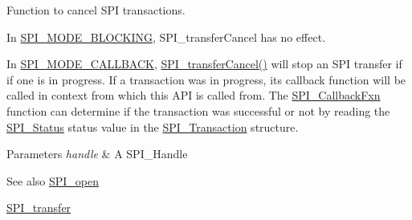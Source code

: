 Function to cancel S\+P\+I transactions. 

In \hyperlink{_s_p_i_8h_ab9ea76c6529d6076eee5e1c4a5a92c6fa0dfb2358e008316426895e7237c398e8}{S\+P\+I\+\_\+\+M\+O\+D\+E\+\_\+\+B\+L\+O\+C\+K\+I\+N\+G}, S\+P\+I\+\_\+transfer\+Cancel has no effect.

In \hyperlink{_s_p_i_8h_ab9ea76c6529d6076eee5e1c4a5a92c6fa5631e69925c47a62a261c78ebbda39fb}{S\+P\+I\+\_\+\+M\+O\+D\+E\+\_\+\+C\+A\+L\+L\+B\+A\+C\+K}, \hyperlink{_s_p_i_8h_a6819f7761fc3505c4f885653ff8121f0}{S\+P\+I\+\_\+transfer\+Cancel()} will stop an S\+P\+I transfer if if one is in progress. If a transaction was in progress, its callback function will be called in context from which this A\+P\+I is called from. The \hyperlink{_s_p_i_8h_a207e2d5a7e7ea5606b6995b6485ca015}{S\+P\+I\+\_\+\+Callback\+Fxn} function can determine if the transaction was successful or not by reading the \hyperlink{_s_p_i_8h_a913c57c335166de9caa54b7eb9ad95fb}{S\+P\+I\+\_\+\+Status} status value in the \hyperlink{struct_s_p_i___transaction}{S\+P\+I\+\_\+\+Transaction} structure.


\begin{DoxyParams}{Parameters}
{\em handle} & A S\+P\+I\+\_\+\+Handle\\
\hline
\end{DoxyParams}
\begin{DoxySeeAlso}{See also}
\hyperlink{_s_p_i_8h_a62cfe494cb1df47cd602e8747e894fd1}{S\+P\+I\+\_\+open} 

\hyperlink{_s_p_i_8h_a989e17f96b54fcc3dc2cac5f8ac6bdb2}{S\+P\+I\+\_\+transfer} 
\end{DoxySeeAlso}
